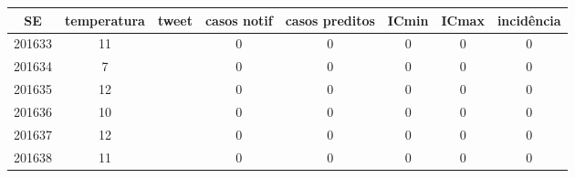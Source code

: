\begin{tabular}{c|ccccccc}
  \hline
SE & temperatura & tweet & casos notif & casos preditos & ICmin & ICmax & incidência \\ 
  \hline
201633 & 11 &  & 0 & 0 & 0 & 0 & 0 \\ 
  201634 & 7 &  & 0 & 0 & 0 & 0 & 0 \\ 
  201635 & 12 &  & 0 & 0 & 0 & 0 & 0 \\ 
  201636 & 10 &  & 0 & 0 & 0 & 0 & 0 \\ 
  201637 & 12 &  & 0 & 0 & 0 & 0 & 0 \\ 
  201638 & 11 &  & 0 & 0 & 0 & 0 & 0 \\ 
   \hline
\end{tabular}
